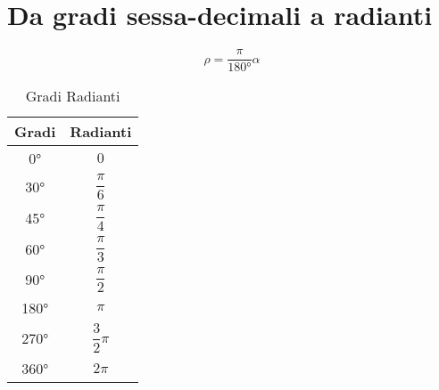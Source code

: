 \section{Da gradi sessa-decimali a radianti}
\begin{equation*}
\rho=\dfrac{\pi}{\ang{180}}\alpha
\end{equation*}
\begin{table}
	\centering
		\begin{tabular}{cc}
		\toprule 
		Gradi	&Radianti \\ 
		\midrule
		\ang{0}	&$0$  \\ 
		\ang{30}	&$\dfrac{\pi}{6}$  \\[0.3cm] 
		\ang{45}	&$\dfrac{\pi}{4}$  \\[0.3cm]  
		\ang{60}	&$\dfrac{\pi}{3}$  \\[0.3cm]  
		\ang{90}	&$\dfrac{\pi}{2}$  \\[0.3cm]  
		\ang{180}	&$\pi$  \\[0.3cm]  
		\ang{270}	&$\dfrac{3}{2}\pi$  \\[0.3cm]  
		\ang{360}	&$2\pi$  \\[0.3cm]  
		\bottomrule
	\end{tabular}
	\caption{Gradi Radianti}
\end{table}
